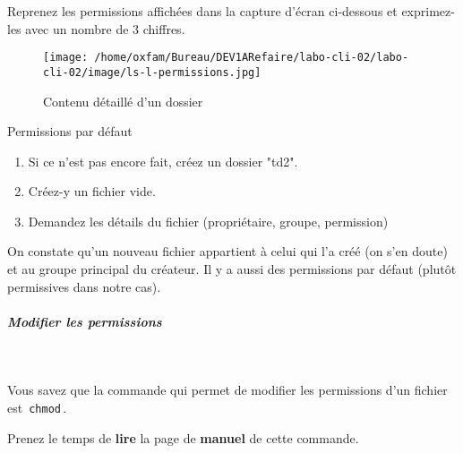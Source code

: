 \documentclass[a4paper,11pt]{article}
\begin{document}
\begin{Exercice}{} 
	Reprenez les permissions affich\'ees dans la capture d'\'ecran ci-dessous 
et exprimez-les avec un nombre de 3 chiffres.  

\par
\begin{figure}[hbt]
	\begin{center}
		\texttt{[image: /home/oxfam/Bureau/DEV1ARefaire/labo-cli-02/labo-cli-02/image/ls-l-permissions.jpg]}
		
	\end{center}
	
	\caption[Contenu d\'etaill\'e d'un dossier]{Contenu d\'etaill\'e d'un dossier}
\end{figure}
\end{Exercice}
		
		
\begin{Tutoriel}{Permissions par d\'efaut} 	
		
		\begin{enumerate}
			
			\item Si ce n'est pas encore fait, cr\'eez un dossier "td2".
			\item Cr\'eez-y un fichier vide.
			\item Demandez les d\'etails du fichier (propri\'etaire, groupe, permission)
		\end{enumerate}
		
		On constate qu'un nouveau fichier appartient \`a celui qui l'a cr\'e\'e 
		(on s'en doute) et au groupe principal du cr\'eateur. 
		Il y a aussi des permissions par d\'efaut (plut\^ot permissives dans notre cas).  
		
		\par
\end{Tutoriel}		
		
		\subparagraph{Modifier les permissions} 

\textcolor{white}{.} \par

\par

Vous savez que la commande qui permet de modifier les permissions d'un fichier est 
\,\verb|chmod|\,.  

\par

Prenez le temps de \textbf{lire} 
la page de \textbf{manuel} de cette commande.   
\end{document}
